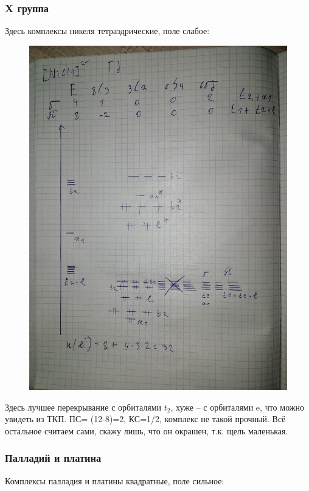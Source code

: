 \subsubsection*{X группа}
Здесь комплексы никеля тетраэдрические, поле слабое:

\begin{figure}[H]
\centering
\includegraphics[scale=.300]{images/halogenides3.jpg}
\end{figure}

Здесь лучшее перекрывание с орбиталями $t_2$, хуже – с орбиталями e, что можно увидеть из ТКП. ПС= (12-8)=2, КС=1/2, комплекс не такой прочный. Всё остальное считаем сами, скажу лишь, что он окрашен, т.к. щель маленькая.

\subsubsection*{Палладий и платина}
Комплексы палладия и платины квадратные, поле сильное:

